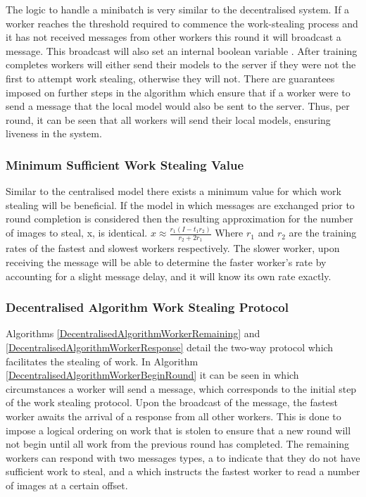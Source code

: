 \documentclass[12pt]{article}
\begin{document}
The logic to handle a minibatch is very similar to the decentralised system. If a worker reaches the threshold required to commence the work-stealing process and it has not received messages from other workers this round it will broadcast a  message. This broadcast will also set an internal boolean variable . After training completes workers will either send their models to the server if they were not the first to attempt work stealing, otherwise they will not.
\newline
\newline
There are guarantees imposed on further steps in the algorithm which ensure that if a worker were to send a  message that the local model would also be sent to the server. Thus, per round, it can be seen that all workers will send their local models, ensuring liveness in the system.

\subsubsection{Minimum Sufficient Work Stealing Value}
Similar to the centralised model there exists a minimum value for which work stealing will be beneficial. If the model in which messages are exchanged prior to round completion is considered then the resulting approximation for the number of images to steal, x,  is identical.
\newline
$x \approx \frac{r_1(I - t_1r_2)}{r_2 + 2r_1}$
\newline
Where $r_1$ and $r_2$ are the training rates of the fastest and slowest workers respectively. The slower worker, upon receiving the message will be able to determine the faster worker's rate by accounting for a slight message delay, and it will know its own rate exactly.

\subsubsection{Decentralised Algorithm Work Stealing Protocol}

Algorithms \ref{DecentralisedAlgorithmWorkerRemaining} and \ref{DecentralisedAlgorithmWorkerResponse} detail the two-way protocol which facilitates the stealing of work. In Algorithm \ref{DecentralisedAlgorithmWorkerBeginRound} it can be seen in which circumstances a worker will send a  message, which corresponds to the initial step of the work stealing protocol.
\newline
\newline
Upon the broadcast of the  message, the fastest worker awaits the arrival of a response from all other workers. This is done to impose a logical ordering on work that is stolen to ensure that a new round will not begin until all work from the previous round has completed. The remaining workers can respond with two messages types, a  to indicate that they do not have sufficient work to steal, and a  which instructs the fastest worker to read a number of images at a certain offset.
\end{document}
